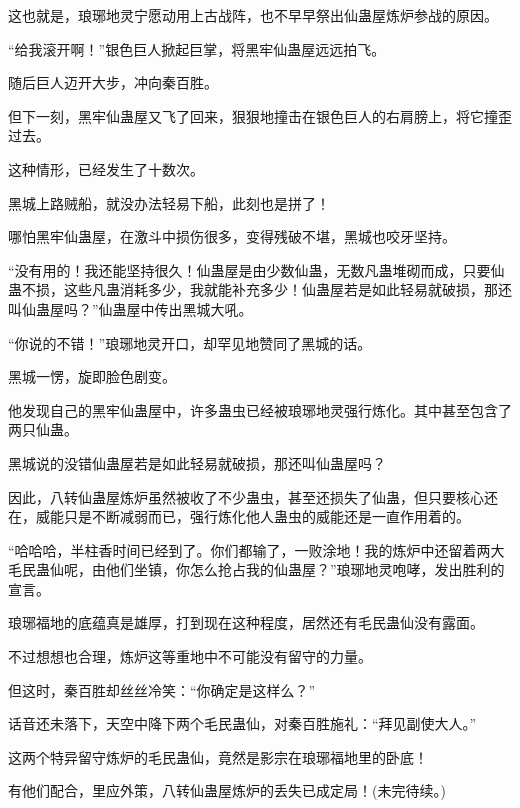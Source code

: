 \begin{this_body}
这也就是，琅琊地灵宁愿动用上古战阵，也不早早祭出仙蛊屋炼炉参战的原因。

“给我滚开啊！”银色巨人掀起巨掌，将黑牢仙蛊屋远远拍飞。

随后巨人迈开大步，冲向秦百胜。

但下一刻，黑牢仙蛊屋又飞了回来，狠狠地撞击在银色巨人的右肩膀上，将它撞歪过去。

这种情形，已经发生了十数次。

黑城上路贼船，就没办法轻易下船，此刻也是拼了！

哪怕黑牢仙蛊屋，在激斗中损伤很多，变得残破不堪，黑城也咬牙坚持。

“没有用的！我还能坚持很久！仙蛊屋是由少数仙蛊，无数凡蛊堆砌而成，只要仙蛊不损，这些凡蛊消耗多少，我就能补充多少！仙蛊屋若是如此轻易就破损，那还叫仙蛊屋吗？”仙蛊屋中传出黑城大吼。

“你说的不错！”琅琊地灵开口，却罕见地赞同了黑城的话。

黑城一愣，旋即脸色剧变。

他发现自己的黑牢仙蛊屋中，许多蛊虫已经被琅琊地灵强行炼化。其中甚至包含了两只仙蛊。

黑城说的没错仙蛊屋若是如此轻易就破损，那还叫仙蛊屋吗？

因此，八转仙蛊屋炼炉虽然被收了不少蛊虫，甚至还损失了仙蛊，但只要核心还在，威能只是不断减弱而已，强行炼化他人蛊虫的威能还是一直作用着的。

“哈哈哈，半柱香时间已经到了。你们都输了，一败涂地！我的炼炉中还留着两大毛民蛊仙呢，由他们坐镇，你怎么抢占我的仙蛊屋？”琅琊地灵咆哮，发出胜利的宣言。

琅琊福地的底蕴真是雄厚，打到现在这种程度，居然还有毛民蛊仙没有露面。

不过想想也合理，炼炉这等重地中不可能没有留守的力量。

但这时，秦百胜却丝丝冷笑：“你确定是这样么？”

话音还未落下，天空中降下两个毛民蛊仙，对秦百胜施礼：“拜见副使大人。”

这两个特异留守炼炉的毛民蛊仙，竟然是影宗在琅琊福地里的卧底！

有他们配合，里应外策，八转仙蛊屋炼炉的丢失已成定局！(未完待续。)

\end{this_body}

